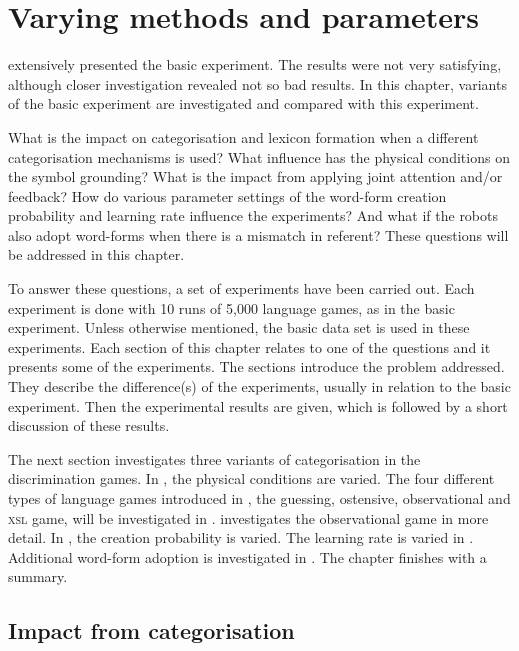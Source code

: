 \chapter{Varying methods and parameters} \label{ch:lex}\label{ch:cat}\label{ch:interaction}\label{ch:feedback}\label{ch:par}

 extensively presented the basic experiment. The results were not very satisfying, although closer investigation revealed not so bad results. In this chapter, variants of the basic experiment are investigated and compared with this experiment.

What is the impact on categorisation and lexicon formation when a different categorisation mechanisms is used? What influence has the physical conditions on the symbol grounding? What is the impact from applying joint attention and/or feedback? How do various parameter settings of the word-form creation probability and learning rate influence the experiments? And what if the robots also adopt word-forms when there is a mismatch in referent? These questions will be addressed in this chapter.

To answer these questions, a set of experiments have been carried out. Each experiment is done with 10 runs of 5,000 language games, as in the basic experiment. Unless otherwise mentioned, the basic data set is used in these experiments. Each section of this chapter relates to one of the questions and it presents some of the experiments. The sections introduce the problem addressed. They describe the difference(s) of the experiments, usually in relation to the basic experiment. Then the experimental results are given, which is followed by a short discussion of these results.


The next section investigates three variants of categorisation in the discrimination games. In , the physical conditions are varied. The four different types of language games introduced in , the guessing, ostensive, observational and \textsc{xsl} game, will be investigated in .  investigates the observational game in more detail. In , the creation probability is varied. The learning rate is varied in . Additional word-form adoption is investigated in . The chapter finishes with a summary.

\section{Impact from categorisation}\label{s:par:cat}

